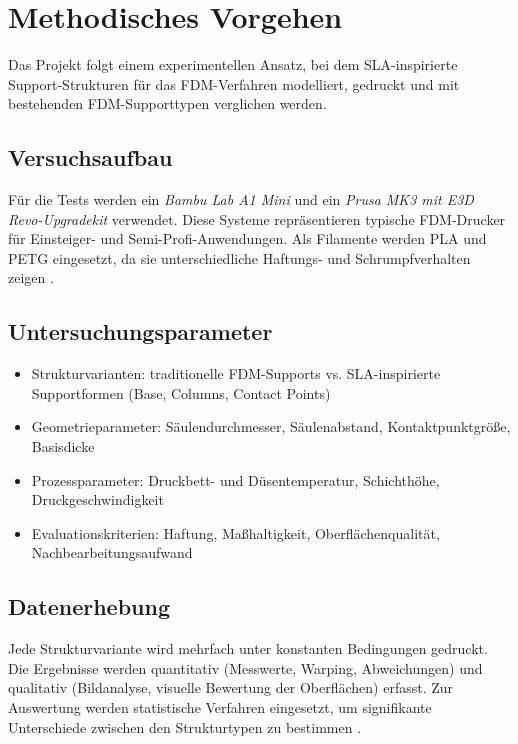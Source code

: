 \chapter{Methodisches Vorgehen}
\label{cha:Methodisches Vorgehen}

Das Projekt folgt einem experimentellen Ansatz, bei dem SLA-inspirierte Support-Strukturen für das FDM-Verfahren modelliert, gedruckt und mit bestehenden FDM-Supporttypen verglichen werden.  

\section{Versuchsaufbau}

Für die Tests werden ein \textit{Bambu Lab A1 Mini} und ein \textit{Prusa MK3 mit E3D Revo-Upgradekit} verwendet.  
Diese Systeme repräsentieren typische FDM-Drucker für Einsteiger- und Semi-Profi-Anwendungen.  
Als Filamente werden PLA und PETG eingesetzt, da sie unterschiedliche Haftungs- und Schrumpfverhalten zeigen \cite{Kristiawan2021}.  

\section{Untersuchungsparameter}

\begin{itemize}
  \item Strukturvarianten: traditionelle FDM-Supports vs. SLA-inspirierte Supportformen (Base, Columns, Contact Points)  
  \item Geometrieparameter: Säulendurchmesser, Säulenabstand, Kontaktpunktgröße, Basisdicke  
  \item Prozessparameter: Druckbett- und Düsentemperatur, Schichthöhe, Druckgeschwindigkeit  
  \item Evaluationskriterien: Haftung, Maßhaltigkeit, Oberflächenqualität, Nachbearbeitungsaufwand
\end{itemize}

\section{Datenerhebung}

Jede Strukturvariante wird mehrfach unter konstanten Bedingungen gedruckt.  
Die Ergebnisse werden quantitativ (Messwerte, Warping, Abweichungen) und qualitativ (Bildanalyse, visuelle Bewertung der Oberflächen) erfasst.  
Zur Auswertung werden statistische Verfahren eingesetzt, um signifikante Unterschiede zwischen den Strukturtypen zu bestimmen \cite{FFFPolymerReview}.
